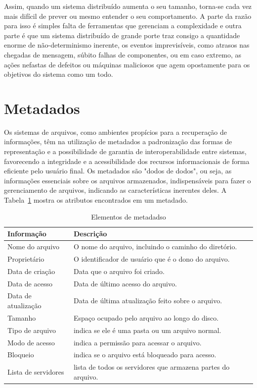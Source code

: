 	Assim, quando um sistema distribuído aumenta o seu tamanho, torna-se cada vez mais difícil de prever ou mesmo entender o seu comportamento. A parte da razão para isso é simples falta de ferramentas que gerenciam a complexidade e outra parte é que um sistema distribuído de grande porte traz consigo a quantidade enorme de não-determinismo inerente, os eventos imprevisíveis, como atrasos nas chegadas de mensagem, súbito falhas de componentes, ou em caso extremo, as ações nefastas de defeitos ou máquinas maliciosos que agem opostamente para os objetivos do sistema como um todo.
	
		\section{Metadados} 
		
		Os sistemas de arquivos, como ambientes propícios para a recuperação de informações, têm na utilização de metadados a padronização das formas de representação e a possibilidade de garantia de interoperabilidade entre sistemas, favorecendo a integridade e a acessibilidade dos recursos informacionais de forma eficiente pelo usuário final. Os metadados são "dodos de dodos", ou seja, as informações essenciais sobre os arquivos armazenados, indispensáveis para fazer o gerenciamento de arquivos, indicando as características inerentes deles. A Tabela~\ref{tab:metadado} mostra os atributos encontrados em um metadado.
		
		\capstartfalse
		\begin{table} [htb]
			\caption{Elementos de metadadso}
			\centering
			\begin{tabular}{|l|l|} \hline
				\textbf{Informação} & \textbf{Descrição} \\ \hline
				
				Nome do arquivo		& O nome do arquivo, incluindo o caminho do diretório.\\ \hline
				Proprietário		& O identificador de usuário que é o dono do arquivo.\\ \hline
				Data de criação     & Data que o arquivo foi criado.\\ \hline
				Data de acesso		& Data de último acesso do arquivo. \\ \hline
				Data de atualização	& Data de última atualização feito sobre o arquivo. \\ \hline
				Tamanho				& Espaço ocupado pelo arquivo ao longo do disco. \\ \hline
				Tipo de arquivo		& indica se ele é uma pasta ou um arquivo normal.  \\ \hline
				Modo de acesso		& indica a permissão para acessar o arquivo. \\ \hline
				Bloqueio			& indica se o arquivo está bloqueado para acesso. \\ \hline
				Lista de servidores	& lista de todos os servidores que armazena partes do arquivo. \\ \hline
				
			\end{tabular}
			\label{tab:metadado}
		\end{table}
		\capstarttrue
	
